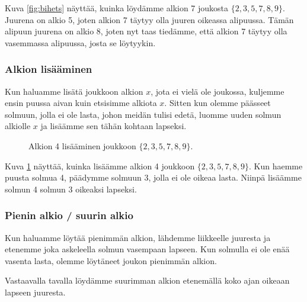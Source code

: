 Kuva \ref{fig:bihets} näyttää, kuinka löydämme alkion 7
joukosta $\{2,3,5,7,8,9\}$.
Juurena on alkio 5, joten alkion 7 täytyy olla juuren
oikeassa alipuussa.
Tämän alipuun juurena on alkio 8,
joten nyt taas tiedämme, että alkion 7 täytyy olla
vasemmassa alipuussa, josta se löytyykin.

\subsubsection{Alkion lisääminen}

Kun haluamme lisätä joukkoon alkion $x$,
jota ei vielä ole joukossa, kuljemme ensin
puussa aivan kuin etsisimme alkiota $x$.
Sitten kun olemme päässeet solmuun,
jolla ei ole lasta, johon meidän tulisi edetä,
luomme uuden solmun alkiolle $x$ ja lisäämme
sen tähän kohtaan lapseksi.

\begin{figure}
\center
{}
\caption{Alkion 4 lisääminen joukkoon $\{2,3,5,7,8,9\}$.}
\label{fig:bihpu2}
\end{figure}

Kuva \ref{fig:bihpu2} näyttää, kuinka lisäämme alkion 4
joukkoon $\{2,3,5,7,8,9\}$.
Kun haemme puusta solmua 4, päädymme solmuun 3,
jolla ei ole oikeaa lasta.
Niinpä lisäämme solmun 4 solmun 3 oikeaksi lapseksi.

\subsubsection{Pienin alkio / suurin alkio}

Kun haluamme löytää pienimmän alkion,
lähdemme liikkeelle juuresta ja etenemme joka askeleella
solmun vasempaan lapseen.
Kun solmulla ei ole enää vasenta lasta,
olemme löytäneet joukon pienimmän alkion.

Vastaavalla tavalla löydämme suurimman alkion
etenemällä koko ajan oikeaan lapseen juuresta.

